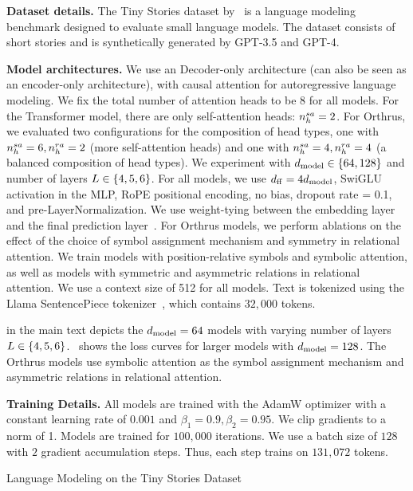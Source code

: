 \textbf{Dataset details.} The Tiny Stories dataset by~\citet{eldanTinyStoriesHowSmall2023} is a language modeling benchmark designed to evaluate small language models. The dataset consists of short stories and is synthetically generated by GPT-3.5 and GPT-4.

\textbf{Model architectures.} We use an Decoder-only architecture (can also be seen as an encoder-only architecture), with causal attention for autoregressive language modeling. We fix the total number of attention heads to be $8$ for all models. For the Transformer model, there are only self-attention heads: $n_h^{sa} = 2$. For Orthrus, we evaluated two configurations for the composition of head types, one with $n_h^{sa} = 6, n_h^{ra} = 2$ (more self-attention heads) and one with $n_h^{sa} = 4, n_h^{ra} = 4$ (a balanced composition of head types). We experiment with $d_{\mathrm{model}} \in \{64, 128\}$ and number of layers $L \in \{4, 5, 6\}$. For all models, we use $d_{\mathrm{ff}} = 4 d_{\mathrm{model}}$, SwiGLU activation in the MLP, RoPE positional encoding, no bias, dropout rate = 0.1, and pre-LayerNormalization. We use weight-tying between the embedding layer and the final prediction layer~\citep{inanTyingWordVectors2016}. For Orthrus models, we perform ablations on the effect of the choice of symbol assignment mechanism and symmetry in relational attention. We train models with position-relative symbols and symbolic attention, as well as models with symmetric and asymmetric relations in relational attention. We use a context size of 512 for all models. Text is tokenized using the Llama SentencePiece tokenizer~\citep{touvronLlamaOpenFoundation2023}, which contains $32,000$ tokens.

 in the main text depicts the $d_{\mathrm{model}} = 64$ models with varying number of layers $L \in \{4, 5, 6\}$.~ shows the loss curves for larger models with $d_{\mathrm{model}} = 128$. The Orthrus models use symbolic attention as the symbol assignment mechanism and asymmetric relations in relational attention.

\textbf{Training Details.} All models are trained with the AdamW optimizer with a constant learning rate of $0.001$ and $\beta_1 = 0.9, \beta_2 = 0.95$. We clip gradients to a norm of 1. Models are trained for $100,000$ iterations. We use a batch size of $128$ with $2$ gradient accumulation steps. Thus, each step trains on $131,072$ tokens.

\begin{table}
    \caption{Language Modeling on the Tiny Stories Dataset}\label{tab:tiny_stories_results}
    
\end{table}


